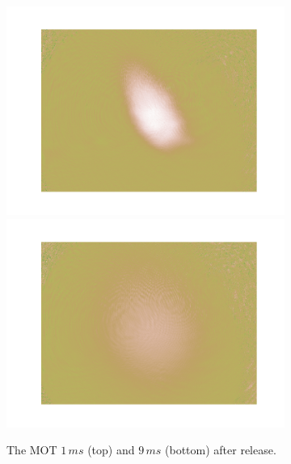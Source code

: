 \begin{figure}
\centering
    \begin{subfigure}[b]{0.3\textwidth}
    \centering
    \includegraphics[width=\textwidth]{figs/MOTimage1.png}
    \includegraphics[width=\textwidth]{figs/MOTimage2.png}
    \caption{The MOT $1\,\unit{ms}$ (top) and $9\,\unit{ms}$ (bottom) after release.}
    \end{subfigure}~~~\begin{subfigure}[b]{0.6\textwidth}
    \centering

\end{subfigure}
\end{figure}
